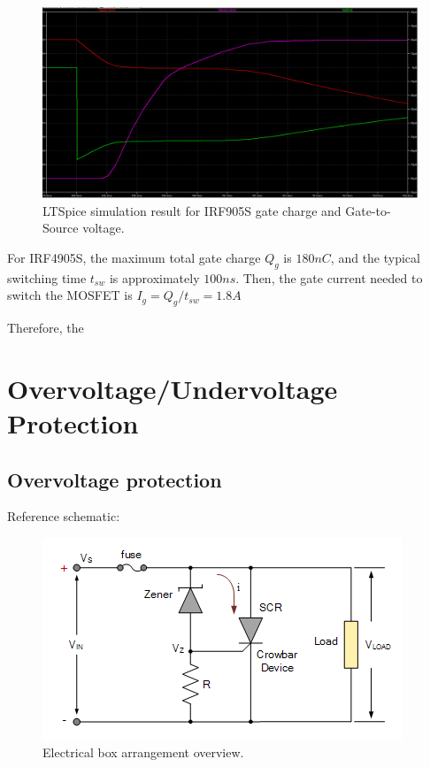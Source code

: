 \documentclass[main.tex]{subfiles}
\begin{document}
    \begin{figure}[!h]
        \centerline{\includegraphics[width=\linewidth]{media/gate_charge_curve_3.png}}
        \caption{LTSpice simulation result for IRF905S gate charge and Gate-to-Source voltage.}
        \label{fig:gate_charge_curve}
    \end{figure}
    
    \justify
    For IRF4905S, the maximum total gate charge $Q_g$ is $180nC$, and the typical switching time $t_{sw}$ is approximately $100ns$. Then, the gate current needed to switch the MOSFET is $I_g = Q_g / t_{sw} = 1.8A$

    \justify
    Therefore, the 

    \justify
    
    \pagebreak

    \section{Overvoltage/Undervoltage Protection}

    \subsection{Overvoltage protection}

    \justify
    Reference schematic:

    \begin{figure}[!h]
        \centerline{\includegraphics[scale=0.5]{media/Zener_Crowbar_OVP.png}}
        \caption{Electrical box arrangement overview.}
        \label{fig:enclosure_arrange}
    \end{figure}
\end{document}
